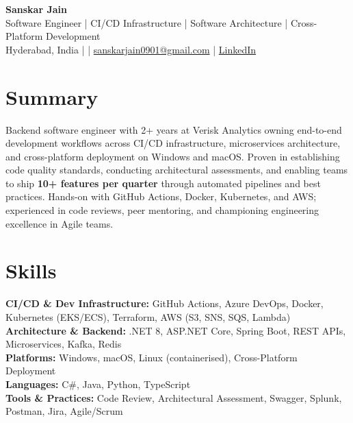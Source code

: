 \documentclass[10pt,letterpaper]{article}
\begin{document}
\begin{center}
    {\Large \textbf{Sanskar Jain}} \\
    Software Engineer \;|\; CI/CD Infrastructure \;|\; Software Architecture \;|\; Cross-Platform Development \\
    Hyderabad, India \enspace |  \enspace | \enspace
    \href{mailto:sanskarjain0901@gmail.com}{sanskarjain0901@gmail.com} \enspace | \enspace
    \href{https://www.linkedin.com/in/sanskar-jain0901/}{LinkedIn}
\end{center}

\vspace{2pt}

\section*{Summary}
Backend software engineer with 2+ years at Verisk Analytics owning end-to-end development workflows across CI/CD infrastructure, microservices architecture, and cross-platform deployment on Windows and macOS. Proven in establishing code quality standards, conducting architectural assessments, and enabling teams to ship \textbf{10+ features per quarter} through automated pipelines and best practices. Hands-on with GitHub Actions, Docker, Kubernetes, and AWS; experienced in code reviews, peer mentoring, and championing engineering excellence in Agile teams.

\section*{Skills}
\textbf{CI/CD \& Dev Infrastructure:} GitHub Actions, Azure DevOps, Docker, Kubernetes (EKS/ECS), Terraform, AWS (S3, SNS, SQS, Lambda) \\
\textbf{Architecture \& Backend:} .NET 8, ASP.NET Core, Spring Boot, REST APIs, Microservices, Kafka, Redis \\
\textbf{Platforms:} Windows, macOS, Linux (containerised), Cross-Platform Deployment \\
\textbf{Languages:} C\#, Java, Python, TypeScript \\
\textbf{Tools \& Practices:} Code Review, Architectural Assessment, Swagger, Splunk, Postman, Jira, Agile/Scrum
\end{document}
